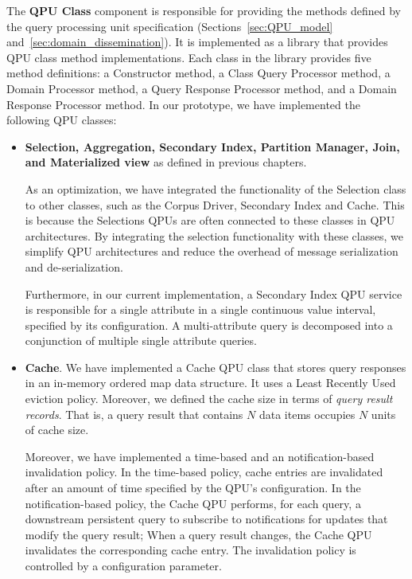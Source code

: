\bigskip
\noindent
The \textbf{QPU Class} component is responsible for providing the methods defined by the query processing
unit specification (Sections~\ref{sec:QPU_model} and~\ref{sec:domain_dissemination}).
It is implemented as a library that provides QPU class method implementations.
Each class in the library provides five method definitions:
a Constructor method, a Class Query Processor method, a Domain Processor method, a Query Response Processor method,
and a Domain Response Processor method.
In our prototype, we have implemented the following QPU classes:
\begin{itemize}
  \item \textbf{Selection, Aggregation, Secondary Index, Partition Manager, Join, and Materialized view} as defined in previous chapters.

  As an optimization, we have integrated the functionality of the Selection class to other classes,
  such as the Corpus Driver, Secondary Index and Cache.
  This is because the Selections QPUs are often connected to these classes in QPU architectures.
  By integrating the selection functionality with these classes, we simplify QPU architectures
  and reduce the overhead of message serialization and de-serialization.

  Furthermore, in our current implementation, a Secondary Index QPU service is responsible for a single attribute in a single
  continuous value interval, specified by its configuration.
  A multi-attribute query is decomposed into a conjunction of multiple single attribute queries.

  \item \textbf{Cache}.
  We have implemented a Cache QPU class that stores query responses in an in-memory ordered map data structure.
  It uses a Least Recently Used eviction policy.
  Moreover, we defined the cache size in terms of \textit{query result records}.
  That is, a query result that contains $N$ data items occupies $N$ units of cache size.

  Moreover, we have implemented a time-based and an notification-based invalidation policy.
  In the time-based policy, cache entries are invalidated after an amount of time specified by the QPU's configuration.
  In the notification-based policy, the Cache QPU performs, for each query,
  a downstream persistent query to subscribe to notifications for updates that modify the query result;
  When a query result changes, the Cache QPU invalidates the corresponding cache entry.
  The invalidation policy is controlled by a configuration parameter.


\end{itemize}
